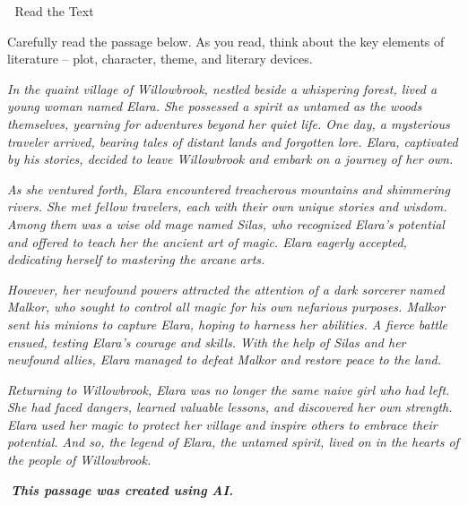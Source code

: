 \documentclass[a4paper,12pt]{article}
\newcommand{\sectionfont}[1]{{\headerfont\fontsize{20pt}{24pt}\selectfont #1}}
\newcommand{\emoji}[1]{{\emojifont #1}}
\begin{document}
\vspace{6pt}

\begin{sectionheader}
\emoji{📖} \sectionfont{\textcolor{dark-text}{Read the Text}}
\end{sectionheader}

\vspace{4pt}

Carefully read the passage below. As you read, think about the key elements of literature -- plot, character, theme, and literary devices.

\vspace{4pt}

\begin{contentbox}
\textit{In the quaint village of Willowbrook, nestled beside a whispering forest, lived a young woman named Elara. She possessed a spirit as untamed as the woods themselves, yearning for adventures beyond her quiet life. One day, a mysterious traveler arrived, bearing tales of distant lands and forgotten lore. Elara, captivated by his stories, decided to leave Willowbrook and embark on a journey of her own.}

\textit{As she ventured forth, Elara encountered treacherous mountains and shimmering rivers. She met fellow travelers, each with their own unique stories and wisdom. Among them was a wise old mage named Silas, who recognized Elara's potential and offered to teach her the ancient art of magic. Elara eagerly accepted, dedicating herself to mastering the arcane arts.}

\textit{However, her newfound powers attracted the attention of a dark sorcerer named Malkor, who sought to control all magic for his own nefarious purposes. Malkor sent his minions to capture Elara, hoping to harness her abilities. A fierce battle ensued, testing Elara's courage and skills. With the help of Silas and her newfound allies, Elara managed to defeat Malkor and restore peace to the land.}

\textit{Returning to Willowbrook, Elara was no longer the same naive girl who had left. She had faced dangers, learned valuable lessons, and discovered her own strength. Elara used her magic to protect her village and inspire others to embrace their potential. And so, the legend of Elara, the untamed spirit, lived on in the hearts of the people of Willowbrook.}

\vspace{4pt}
\emoji{📍}\textit{\textbf{This passage was created using AI.}}
\end{contentbox}
\end{document}
